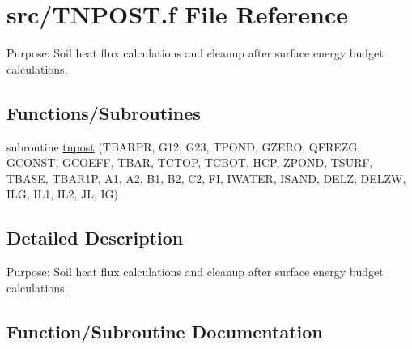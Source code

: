 \hypertarget{TNPOST_8f}{}\section{src/\+T\+N\+P\+O\+S\+T.f File Reference}
\label{TNPOST_8f}


Purpose\+: Soil heat flux calculations and cleanup after surface energy budget calculations.  


\subsection*{Functions/\+Subroutines}
\begin{DoxyCompactItemize}
\item 
subroutine \hyperlink{TNPOST_8f_a1d7de0e4ebe964e4c638efcb49b3c740}{tnpost} (T\+B\+A\+R\+P\+R, G12, G23, T\+P\+O\+N\+D, G\+Z\+E\+R\+O, Q\+F\+R\+E\+Z\+G, G\+C\+O\+N\+S\+T, G\+C\+O\+E\+F\+F, T\+B\+A\+R, T\+C\+T\+O\+P, T\+C\+B\+O\+T, H\+C\+P, Z\+P\+O\+N\+D, T\+S\+U\+R\+F, T\+B\+A\+S\+E, T\+B\+A\+R1\+P, A1, A2, B1, B2, C2, F\+I, I\+W\+A\+T\+E\+R, I\+S\+A\+N\+D, D\+E\+L\+Z, D\+E\+L\+Z\+W, I\+L\+G, I\+L1, I\+L2, J\+L, I\+G)
\end{DoxyCompactItemize}


\subsection{Detailed Description}
Purpose\+: Soil heat flux calculations and cleanup after surface energy budget calculations. 



\subsection{Function/\+Subroutine Documentation}
\hypertarget{TNPOST_8f_a1d7de0e4ebe964e4c638efcb49b3c740}{}
